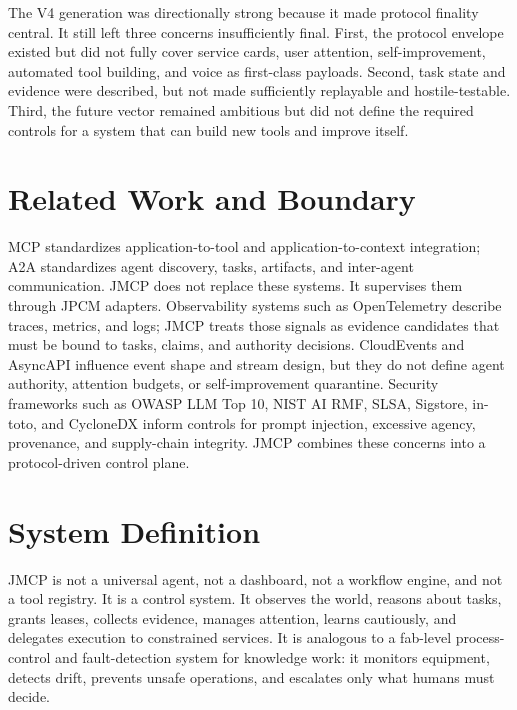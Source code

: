 \documentclass[10pt,journal,onecolumn]{IEEEtran}
\begin{document}
The V4 generation was directionally strong because it made protocol finality central. It still left three concerns insufficiently final. First, the protocol envelope existed but did not fully cover service cards, user attention, self-improvement, automated tool building, and voice as first-class payloads. Second, task state and evidence were described, but not made sufficiently replayable and hostile-testable. Third, the future vector remained ambitious but did not define the required controls for a system that can build new tools and improve itself.

\section{Related Work and Boundary}
MCP standardizes application-to-tool and application-to-context integration; A2A standardizes agent discovery, tasks, artifacts, and inter-agent communication. JMCP does not replace these systems. It supervises them through JPCM adapters. Observability systems such as OpenTelemetry describe traces, metrics, and logs; JMCP treats those signals as evidence candidates that must be bound to tasks, claims, and authority decisions. CloudEvents and AsyncAPI influence event shape and stream design, but they do not define agent authority, attention budgets, or self-improvement quarantine. Security frameworks such as OWASP LLM Top 10, NIST AI RMF, SLSA, Sigstore, in-toto, and CycloneDX inform controls for prompt injection, excessive agency, provenance, and supply-chain integrity. JMCP combines these concerns into a protocol-driven control plane.

\section{System Definition}
JMCP is not a universal agent, not a dashboard, not a workflow engine, and not a tool registry. It is a control system. It observes the world, reasons about tasks, grants leases, collects evidence, manages attention, learns cautiously, and delegates execution to constrained services. It is analogous to a fab-level process-control and fault-detection system for knowledge work: it monitors equipment, detects drift, prevents unsafe operations, and escalates only what humans must decide.
\end{document}
